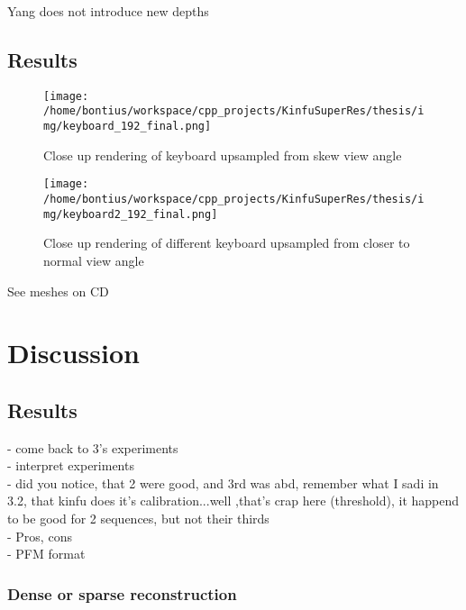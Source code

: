 \documentclass{ucl_thesis}
\begin{document}
Yang does not introduce new depths

\section{Results}
\label{sec:results}

\begin{figure}[h!]\centering
    \texttt{[image: /home/bontius/workspace/cpp\_projects/KinfuSuperRes/thesis/img/keyboard\_192\_final.png]}
    \caption{Close up rendering of keyboard upsampled from skew view angle}
    \label{fig:keyboard_192}
\end{figure}

\begin{figure}[h!]\centering
    \texttt{[image: /home/bontius/workspace/cpp\_projects/KinfuSuperRes/thesis/img/keyboard2\_192\_final.png]}
    \caption{Close up rendering of different keyboard upsampled from closer to normal view angle}
    \label{fig:keyboard2_192}
\end{figure}

See meshes on CD

\chapter{Discussion} 
\label{chp:discussion}

\section{Results}
\label{sec:discussion_results}

    - come back to 3's experiments\\
    - interpret experiments\\
    - did you notice, that 2 were good, and 3rd was abd, remember what I sadi in 3.2, that kinfu does it's calibration...well ,that's crap here (threshold), it happend to be good for 2 sequences, but not their thirds \\
-     Pros, cons \\
- PFM format \\

\subsection{Dense or sparse reconstruction}
\end{document}
